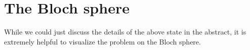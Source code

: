\section{The Bloch sphere}

While we could just discuss the details of the above state in the abstract, it is extremely helpful to visualize the problem on the Bloch sphere.